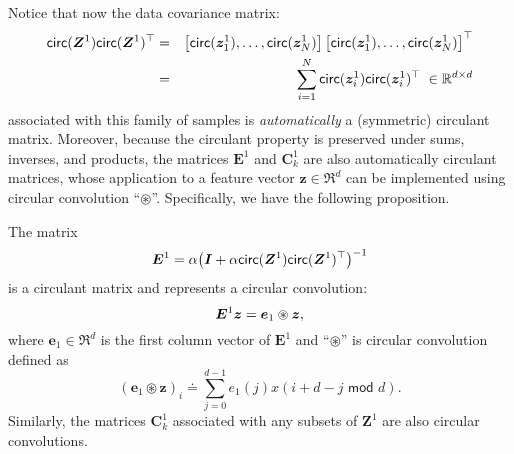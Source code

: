 \documentclass[\toplevelprefix/book-main.tex]{subfiles}
\begin{document}
Notice that now the data covariance matrix: 
\begin{eqnarray}
\mathsf{circ}(\bm Z^1) \mathsf{circ}(\bm Z^1)^\top 
&=& \left[ \mathsf{circ}(\bm{z}_{1}^1), \dots, \mathsf{circ}(\bm{z}_{N}^1) \right] \left[ \mathsf{circ}(\bm{z}_{1}^1), \dots, \mathsf{circ} (\bm{z}_{N}^1) \right]^\top \nonumber \\
&=& \sum_{i =1}^N \mathsf{circ}(\bm{z}_{i}^1) \mathsf{circ}(\bm{z}_{i}^1)^\top \;\in \mathbb{R}^{d\times d} 
\end{eqnarray}
associated with this family of samples is {\em automatically} a (symmetric) circulant matrix. Moreover, because the circulant property is preserved under sums, inverses, and products, the matrices $\bm E^1$ and $\bm C^1_k$ are also automatically circulant matrices, whose application to a feature vector $\bm z \in \Re^d$ can be implemented using circular convolution ``$\circledast$''.
Specifically, we have the following proposition. 

\begin{proposition}
The matrix 
\begin{equation}
    \bm E^1 = \alpha\big(\bm I + \alpha \mathsf{circ}(\bm Z^1) \mathsf{circ}(\bm Z^1)^\top \big)^{-1}
\end{equation}
is a circulant matrix and represents a circular convolution: 
$$\bm E^1 \bm{z} = \bm e_1 \circledast \bm{z},$$ 
where $\bm e_1 \in \Re^d$ is the first column vector of $\bm E^1$ and ``$\circledast$'' is circular convolution defined as
\begin{equation*}
    (\bm e_1 \circledast \bm z)_{i} \doteq \sum_{j=0}^{d-1} e_1(j) x(i+ d-j \,\, \textsf{mod} \,\,d).
\end{equation*}
Similarly, the matrices $\bm C^1_k$ associated with any subsets of $\bm Z^1$ are also circular convolutions. 
\label{prop:circular-conv-1}
\end{proposition}
\end{document}
